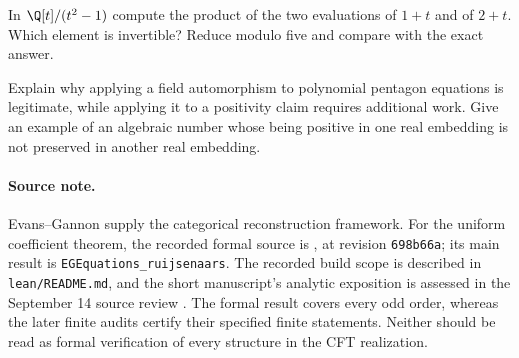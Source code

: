 \begin{exercise}\label{ex:component-norm}
In $\Q[t]/(t^2-1)$ compute the product of the two evaluations
of $1+t$ and of $2+t$.  Which element is invertible?  Reduce
modulo five and compare with the exact answer.

\par\smallskip{}\par
\end{exercise}

\begin{exercise}\label{ex:unitarity-hierarchy}
Explain why applying a field automorphism to polynomial pentagon
equations is legitimate, while applying it to a positivity claim
requires additional work.  Give an example of an algebraic number
whose being positive in one real embedding is not preserved in
another real embedding.

\par\smallskip{}\par
\end{exercise}

\paragraph{Source note.}
Evans--Gannon supply the categorical reconstruction framework.
For the uniform coefficient theorem, the recorded formal source is
, at
revision \texttt{698b66a}; its main result is
\texttt{EGEquations\_ruijsenaars}. The recorded build scope is
described in \texttt{lean/README.md}, and the short manuscript's
analytic exposition is assessed in the September 14 source review
. The formal result
covers every odd order, whereas the later finite audits certify
their specified finite statements. Neither should be read as
formal verification of every structure in the CFT realization.

